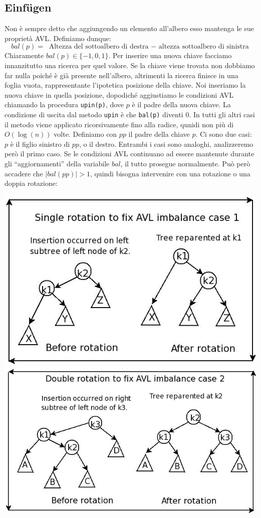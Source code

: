 \documentclass[a4paper]{book}
\newcommand{\inline}[1]{\lstinline!#1!}%
\begin{document}
\subsection*{Einfügen}
Non è sempre detto che aggiungendo un elemento all'albero esso mantenga le sue proprietà AVL. Definiamo dunque:
$$ bal(p)=\mbox{ Altezza del sottoalbero di destra $-$ altezza sottoalbero di sinistra}$$
Chiaramente $bal(p) \in \{-1,0,1\}$. Per inserire una nuova chiave facciamo innanzitutto una ricerca per quel valore. Se la chiave viene trovata non dobbiamo far nulla poiché è già presente nell'albero, altrimenti la ricerca finisce in una foglia vuota, rappresentante l'ipotetica posizione della chiave. Noi inseriamo la nuova chiave in quella posizione, dopodiché aggiustiamo le condizioni AVL chiamando la procedura \inline{upin(p)}, dove $p$ è il padre della nuova chiave. La condizione di uscita dal metodo \inline{upin} è che \inline{bal(p)} diventi 0. In tutti gli altri casi il metodo viene applicato ricorsivamente fino alla radice, qunidi non più di $O(\log(n))$ volte. Definiamo con $pp$ il padre della chiave $p$. Ci sono due casi: $p$ è il figlio sinistro di $pp$, o il destro. Entrambi i casi sono analoghi, analizzeremo però il primo caso. Se le condizioni AVL continuano ad essere mantenute durante gli ``aggiornamenti'' della variabile $bal$, il tutto prosegue normalmente. Può però accadere che $|bal(pp)|>1$, quindi bisogna intervenire con una rotazione o una doppia rotazione:
\begin{center}
\includegraphics[scale=0.6]{Figures/singlerot.jpg}
\includegraphics[scale=0.55]{Figures/doublerot.jpg}
\end{center}
\end{document}
